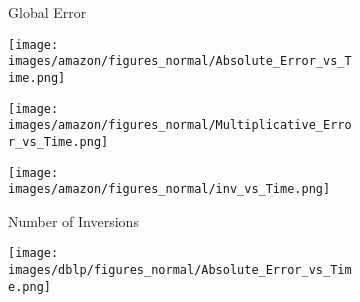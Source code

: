 %
\begin{figure*}[htbp]
	\centering
	\begin{subfigure}[b]{\textwidth}
		\centering
		\begin{minipage}[b]{0.05\textwidth}
			\centering
		\end{minipage}%
		\begin{minipage}[b]{0.3\textwidth}
			\centering
			\caption*{Global Error} %
			\texttt{[image: images/amazon/figures\_normal/Absolute\_Error\_vs\_Time.png]} %
			
		\end{minipage}%
		\begin{minipage}[b]{0.3\textwidth}
			\centering
			\texttt{[image: images/amazon/figures\_normal/Multiplicative\_Error\_vs\_Time.png]} %
			
		\end{minipage}%
		\begin{minipage}[b]{0.3\textwidth}
			\centering
			\caption*{Number of Inversions} %
			\texttt{[image: images/amazon/figures\_normal/inv\_vs\_Time.png]} %
		\end{minipage}
	\end{subfigure}
	\begin{subfigure}[b]{\textwidth}
	\centering
	\begin{minipage}[b]{0.05\textwidth}
		\centering
	\end{minipage}%
	\begin{minipage}[b]{0.3\textwidth}
		\centering
		\texttt{[image: images/dblp/figures\_normal/Absolute\_Error\_vs\_Time.png]} %
		

\end{minipage}
\end{subfigure}
\end{figure*}
